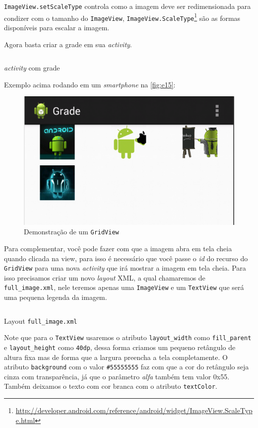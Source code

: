 \documentclass[a4paper,12pt,brazil,oneside]{book}
\begin{document}
\begin{singlespace}
  \texttt{ImageView.setScaleType} controla como a imagem deve ser redimensionada para condizer com o tamanho do \texttt{ImageView}, \texttt{ImageView.ScaleType}\footnote{\href{http://developer.android.com/reference/android/widget/ImageView.ScaleType.html}{http://developer.android.com/reference/android/widget/ImageView.ScaleType.html}} são as formas disponíveis para escalar a imagem.

Agora basta criar a grade em sua \emph{activity}.

\begin{listing}[H]
\inputminted[linenos=true,fontsize=\small,frame=lines, framesep=2mm, tabsize=2,numbersep=5pt]{java}{src/design/grade-activity.java}
\caption{\emph{activity} com grade}
\end{listing}	

Exemplo acima rodando em um \emph{smartphone} na \autoref{fig:e15}:

\begin{figure}[H]
  \centering
  \includegraphics[width=.475\textwidth]{figuras/design/grade-exemplo1.png}
  \caption{Demonstração de um \texttt{GridView}}
  \label{fig:e15}
\end{figure}

Para complementar, você pode fazer com que a imagem abra em tela cheia quando clicada na view, para isso é necessário que você passe o \emph{id} do recurso do \texttt{GridView} para uma nova \emph{activity} que irá mostrar a imagem em tela cheia.
Para isso precisamos criar um novo \emph{layout} XML, a qual chamaremos de \texttt{full\_image.xml}, nele teremos apenas uma \texttt{ImageView} e um \texttt{TextView} que será uma pequena legenda da imagem.

\begin{listing}[H]
\inputminted[linenos=true,fontsize=\small,frame=lines, framesep=2mm, tabsize=2,numbersep=5pt]{xml}{src/design/full-image.xml}
\caption{Layout \texttt{full\_image.xml}}
\end{listing}	

Note que para o \texttt{TextView} usaremos o atributo \texttt{layout\_width} como \texttt{fill\_parent} e \texttt{layout\_height} como \texttt{40dp}, dessa forma criamos um pequeno retângulo de altura fixa mas de forma que a largura preencha a tela completamente. O atributo \texttt{background} com o valor \texttt{\#55555555} faz com que a cor do retângulo seja cinza com transparência, já que o parâmetro \emph{alfa} também tem valor 0x55. Também deixamos o texto com cor branca com o atributo \texttt{textColor}.


\end{singlespace}
\end{document}
